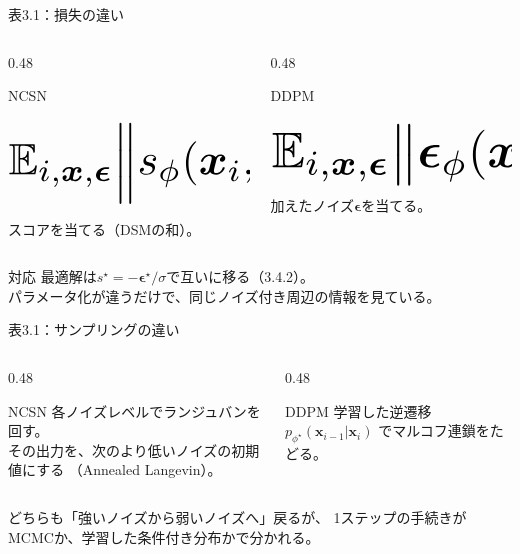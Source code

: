 \asmain
\begin{frame}{表3.1：損失の違い}
    \begin{columns}[T,onlytextwidth]
        \begin{column}{0.48\textwidth}
            \begin{block}{NCSN}
                \[
                    \resizebox{0.95\textwidth}{!}{$
                    \mathbb{E}_{i,\bm{x},\bm{\epsilon}}
                    \Bigl\|
                    s_\phi(\bm{x}_i,\sigma_i)
                    +
                    \dfrac{\bm{\epsilon}}{\sigma_i}
                    \Bigr\|_{2}^{2}
                    $}
                \]
                スコアを当てる（DSMの和）。
            \end{block}
        \end{column}
        \begin{column}{0.48\textwidth}
            \begin{block}{DDPM}
                \[
                    \resizebox{0.95\textwidth}{!}{$
                    \mathbb{E}_{i,\bm{x},\bm{\epsilon}}
                    \bigl\|
                    \bm{\epsilon}_\phi(\bm{x}_i,i)
                    -
                    \bm{\epsilon}
                    \bigr\|_{2}^{2}
                    $}
                \]
                加えたノイズ$\bm{\epsilon}$を当てる。
            \end{block}
        \end{column}
    \end{columns}
    \vfill
    \begin{block}{対応}
        最適解は$s^{\star}=-\bm{\epsilon}^{\star}/\sigma$で互いに移る（3.4.2）。\\
        パラメータ化が違うだけで、同じノイズ付き周辺の情報を見ている。
    \end{block}
\end{frame}
\asmain
\begin{frame}{表3.1：サンプリングの違い}
    \begin{columns}[T,onlytextwidth]
        \begin{column}{0.48\textwidth}
            \begin{block}{NCSN}
                各ノイズレベルでランジュバンを回す。\\
                その出力を、次のより低いノイズの初期値にする
                （Annealed Langevin）。
            \end{block}
        \end{column}
        \begin{column}{0.48\textwidth}
            \begin{block}{DDPM}
                学習した逆遷移
                $p_{\phi^\star}(\bm{x}_{i-1}|\bm{x}_i)$
                でマルコフ連鎖をたどる。
            \end{block}
        \end{column}
    \end{columns}
    \vfill
    どちらも「強いノイズから弱いノイズへ」戻るが、
    1ステップの手続きがMCMCか、学習した条件付き分布かで分かれる。
\end{frame}
